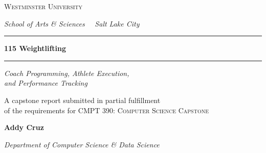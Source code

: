 \onecolumn
\thispagestyle{empty}

\begingroup
\setlength{\parindent}{0pt}
\setlength{\parskip}{0pt}
\centering

\vspace*{0.7in}

{\fontsize{12}{14}\selectfont
 \color{wuFlint}\textsc{Westminster University}\par}
\vspace{2pt}
{\fontsize{10}{12}\selectfont\itshape
 \color{wuFlint}School of Arts \& Sciences \, \textbar \, Salt Lake City\par}

\vspace{0.30in}
{\color{wuCopper}\rule{1.6in}{0.6pt}}

\vspace{1.20in}

{\fontsize{30}{36}\bfseries\selectfont
 \color{wuNight}115 Weightlifting\par}

\vspace{0.18in}
{\color{wuCopper}\rule{4.0in}{0.4pt}}
\vspace{0.18in}

{\fontsize{15}{20}\itshape\selectfont
 Coach Programming, Athlete Execution, \\[2pt] and Performance Tracking\par}

\vspace{0.95in}

{\fontsize{11}{14}\selectfont
 \color{wuFlint}A capstone report submitted in partial fulfillment\\
 of the requirements for \textsc{CMPT 390: Computer Science Capstone}\par}

\vspace{0.40in}

{\fontsize{16}{20}\bfseries\selectfont Addy Cruz\par}
\vspace{4pt}
{\fontsize{10.5}{13}\itshape\selectfont
 \color{wuFlint}Department of Computer Science \& Data Science\par}

